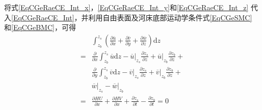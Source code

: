                             将式\eqref{EqCGeRaeCE_Int_x}，\eqref{EqCGeRaeCE_Int_y}和\eqref{EqCGeRaeCE_Int_z}
                            代入\eqref{EqCGeRaeCE_Int}，并利用自由表面及河床底部运动学条件式\eqref{EqCGeSMC}
                            和\eqref{EqCGeBMC}，可得
                            \begin{equation*}
                              \begin{aligned}
  &\int_{z_{b}}^{ z_{s}}\!
  \left(
    \frac{\partial \overline{u}}{\partial x} +
    \frac{\partial \overline{v}}{\partial y} +
    \frac{\partial \overline{w}}{\partial z}
  \right)
  \mathrm{d}z
  \\
                                =&
                                \frac{\partial}{\partial x}
                                \int_{z_{b}}^{ z_{s}}\!
                                \overline{u}
                                \mathrm{d}z
                                -
                                \left.\overline{u}\right|_{z_{s}}
                                  \frac{\partial z_{s}}{\partial z}
                                  +
                                  \left.\overline{u}\right|_{z_{b}}
                                    \frac{\partial z_{b}}{\partial z}
                                    + \\
                                 &
                                 \frac{\partial}{\partial y}
                                 \int_{z_{b}}^{ z_{s}}\!
                                 \overline{v}
                                 \mathrm{d}z
                                 -
                                 \left.\overline{v}\right|_{z_{s}}
                                   \frac{\partial z_{s}}{\partial z}
                                   +
                                   \left.\overline{v}\right|_{z_{b}}
                                     \frac{\partial z_{b}}{\partial z}
                                     + \\
                                 &
                                 \left.\overline{w}\right|_{z_{s}}
                                   -
                                   \left.\overline{w}\right|_{z_{b}}
                                     \\
                                =&
                                \frac{\partial HU}{\partial x} +
                                \frac{\partial HV}{\partial x} +
                                \frac{\partial  z_{s}}{\partial t} -
                                \frac{\partial z_{b}}{\partial t}
                                =
                                0
                              \end{aligned}
                            \end{equation*}
